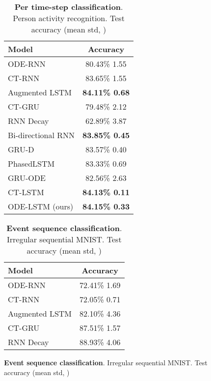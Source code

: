 \documentclass{article}
\makeatletter
\def\adl@drawiv#1#2#3{\hskip.5\tabcolsep
    \xleaders#3{#2.5\@tempdimb #1{1}#2.5\@tempdimb}#2\z@ plus1fil minus1fil\relax
    \hskip.5\tabcolsep}
\newcommand{\cdashlinelr}[1]{\noalign{\vskip\aboverulesep
        \global\let\@dashdrawstore\adl@draw
        \global\let\adl@draw\adl@drawiv}
    \cdashline{#1}
    \noalign{\global\let\adl@draw\@dashdrawstore
        \vskip\belowrulesep}}
\makeatother
\begin{document}
\begin{figure}[!t]
  \begin{minipage}{\textwidth}
  \vspace{0mm}
  \begin{minipage}[b]{0.45\textwidth}
    \centering
 \begin{table}[H]
    \centering
    \caption{\textbf{Per time-step classification}. Person activity recognition. Test accuracy (mean  std, )}
    \vspace{0mm}
    \begin{tabular}{lc}
    \toprule
    Model & Accuracy \\
    \hline
    ODE-RNN  & 80.43\%  1.55 \\
    CT-RNN  & 83.65\%  1.55 \\
    Augmented LSTM  & \textbf{84.11\%  0.68} \\
    CT-GRU & 79.48\%  2.12 \\
    RNN Decay & 62.89\%  3.87 \\
    Bi-directional RNN  &  \textbf{83.85\%  0.45} \\
    GRU-D  &  83.57\%  0.40 \\
    PhasedLSTM  &  83.33\%  0.69 \\
    GRU-ODE  & 82.56\%  2.63 \\
    CT-LSTM &  \textbf{84.13\%  0.11} \\
    \cdashlinelr{1-2}
    ODE-LSTM (ours)  &  \textbf{84.15\%  0.33} \\
    \bottomrule
    \end{tabular}
\label{tab:real_human_activity}
\end{table}
  \end{minipage}
  \hfill
  \begin{minipage}[b]{0.45\textwidth}
    \centering
 \begin{table}[H]
    \centering
    \caption{\textbf{Event sequence classification}. Irregular sequential MNIST. Test accuracy (mean  std, )}
    \vspace{0mm}
    \begin{tabular}{lc}
    \toprule
    Model &  Accuracy \\
    \hline
    ODE-RNN   & 72.41\%  1.69\\
    CT-RNN   & 72.05\%  0.71\\
    Augmented LSTM   & 82.10\%  4.36\\
    CT-GRU  & 87.51\%  1.57\\
    RNN Decay  &  88.93\%  4.06\\

\end{tabular}
\end{table}
\end{minipage}
\end{minipage}
\end{figure}
\end{document}
